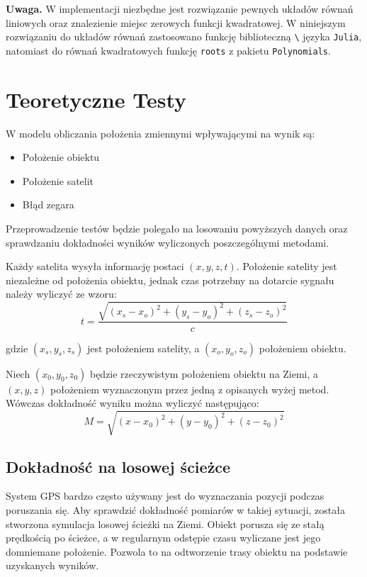 \documentclass{article}
\begin{document}
\textbf{Uwaga.} \enspace W implementacji niezbędne jest rozwiązanie pewnych układów równań liniowych
oraz znalezienie miejsc zerowych funkcji kwadratowej. W niniejszym rozwiązaniu do układów równań zastosowano
funkcję biblioteczną \texttt{\textbackslash} języka \texttt{Julia}, natomiast do równań kwadratowych funkcję \texttt{roots}
z pakietu \texttt{Polynomials}.

\section{Teoretyczne Testy}
\par W modelu obliczania położenia zmiennymi wpływającymi na wynik są:
\begin{itemize}
 \item Położenie obiektu
 \item Położenie satelit
 \item Błąd zegara
\end{itemize}

Przeprowadzenie testów będzie polegało na losowaniu powyższych  danych oraz sprawdzaniu dokładności wyników wyliczonych poszczególnymi metodami.

\par Każdy satelita wysyła informację postaci $(x, y, z, t)$. Położenie satelity jest niezależne od położenia obiektu, jednak czas potrzebny na dotarcie sygnału należy wyliczyć ze wzoru:
	\begin{equation}
		\label{eq:time_test}
	 t = \frac{  \sqrt{ (x_s - x_o)^2 + (y_s-y_o)^2 + (z_s - z_o)^2 } }{c}
	 \end{equation}

	gdzie $(x_s, y_s, z_s)$ jest położeniem satelity, a $(x_o, y_o, z_o)$ położeniem obiektu.

\par Niech $(x_{0}, y_{0}, z_{0})$ będzie rzeczywistym położeniem obiektu na Ziemi, a $(x, y, z)$ położeniem wyznaczonym przez jedną z opisanych wyżej metod. Wówczas dokładność wyniku można wyliczyć następująco:
	$$ M = \sqrt{(x-x_{0})^2 +  (y-y_{0})^2 + (z - z_{0})^2} $$

\subsection{Dokładność na losowej ścieżce}
	System GPS bardzo często używany jest do wyznaczania pozycji podczas poruszania się.  Aby sprawdzić dokładność pomiarów w takiej sytuacji,  została stworzona symulacja losowej ścieżki na Ziemi. Obiekt porusza się ze stałą prędkością po ścieżce, a  w regularnym odstępie czasu wyliczane jest jego domniemane położenie. Pozwola to na odtworzenie trasy obiektu na podstawie uzyskanych wyników.
\end{document}

